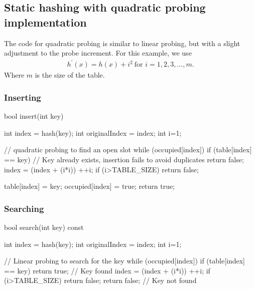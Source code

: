 \documentclass{report}
\begin{document}
\pagebreak 
\subsection{Static hashing with quadratic probing implementation}
\bigbreak \noindent 
The code for quadratic probing is similar to linear probing, but with a slight adjustment to the probe increment. For this example, we use
\begin{align*}
    h^{\prime}(x) = h(x) + i^{2} \ \text{for } i=1,2,3,...,m
.\end{align*}
Where $m$ is the size of the table.
\bigbreak \noindent 
\subsubsection{Inserting}
\bigbreak \noindent 
\begin{cppcode}
    bool insert(int key) {
        int index = hash(key);
        int originalIndex = index;
        int i=1;

        // quadratic probing to find an open slot
        while (occupied[index]) {
            if (table[index] == key) {
                // Key already exists, insertion fails to avoid duplicates
                return false;
            }
            index = (index + (i*i)) %
            ++i; if (i>TABLE_SIZE) return false;
        }

        table[index] = key;
        occupied[index] = true;
        return true;
    }
\end{cppcode}

\pagebreak 
\bigbreak \noindent 
\subsubsection{Searching}
\bigbreak \noindent 
\begin{cppcode}
    bool search(int key) const {
        int index = hash(key);
        int originalIndex = index;
        int i=1;

        // Linear probing to search for the key
        while (occupied[index]) {
            if (table[index] == key) {
                return true;  // Key found
            }
            index = (index + (i*i)) %
            ++i; if (i>TABLE_SIZE) return false;
        }
        return false;  // Key not found
    }
\end{cppcode}

\pagebreak 
\end{document}

